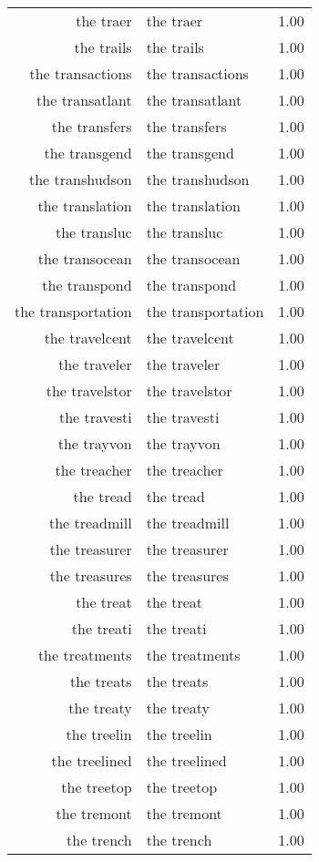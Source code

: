 \begin{table}[ht]
\begin{tabular}{rlr}
  the traer & the traer & 1.00 \\ 
  the trails & the trails & 1.00 \\ 
  the transactions & the transactions & 1.00 \\ 
  the transatlant & the transatlant & 1.00 \\ 
  the transfers & the transfers & 1.00 \\ 
  the transgend & the transgend & 1.00 \\ 
  the transhudson & the transhudson & 1.00 \\ 
  the translation & the translation & 1.00 \\ 
  the transluc & the transluc & 1.00 \\ 
  the transocean & the transocean & 1.00 \\ 
  the transpond & the transpond & 1.00 \\ 
  the transportation & the transportation & 1.00 \\ 
  the travelcent & the travelcent & 1.00 \\ 
  the traveler & the traveler & 1.00 \\ 
  the travelstor & the travelstor & 1.00 \\ 
  the travesti & the travesti & 1.00 \\ 
  the trayvon & the trayvon & 1.00 \\ 
  the treacher & the treacher & 1.00 \\ 
  the tread & the tread & 1.00 \\ 
  the treadmill & the treadmill & 1.00 \\ 
  the treasurer & the treasurer & 1.00 \\ 
  the treasures & the treasures & 1.00 \\ 
  the treat & the treat & 1.00 \\ 
  the treati & the treati & 1.00 \\ 
  the treatments & the treatments & 1.00 \\ 
  the treats & the treats & 1.00 \\ 
  the treaty & the treaty & 1.00 \\ 
  the treelin & the treelin & 1.00 \\ 
  the treelined & the treelined & 1.00 \\ 
  the treetop & the treetop & 1.00 \\ 
  the tremont & the tremont & 1.00 \\ 
  the trench & the trench & 1.00 \\ 

\end{tabular}
\end{table}
